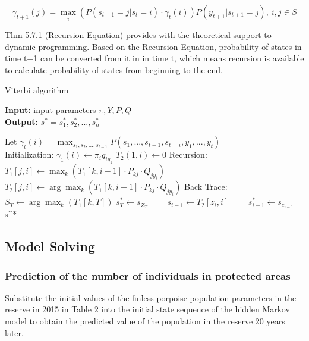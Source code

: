 \documentclass[12pt]{article}  %
\begin{document}
\begin{Theorem} 
\begin{equation}
\gamma_{t+1}(j) = \max_i ( P(s_{t+1}=j|s_t=i) \cdot \gamma_t(i) )P(y_{t+1}|s_{t+1}=j) , \ i,j \in S   
\end{equation}

\end{Theorem}

Thm 5.7.1 (Recursion Equation) provides with the theoretical support to dynamic programming. Based on the Recursion Equation, probability of states in time t+1 can be converted from it in in time t, which means recursion is available to calculate probability of states from beginning to the end.


\begin{algorithm}[]
\caption{Viterbi algorithm}
\hspace*{0.02in} {\bf Input:}
input parameters $\pi ,Y , P, Q$\\
\hspace*{0.02in} {\bf Output:} 
$s^*={s^*_1,s^*_2,...,s^*_n}$
\begin{algorithmic}[1]
\State
Let $\gamma_t(i)=\max_{s_1,s_2,...,s_{t-1}}P(s_1,...,s_{t-1},s_{t=i},y_1,...,y_t)$ \\
Initialization:
    \State $\gamma_1(i) \xleftarrow{} \pi_i q_{i y_1}$
    \State $T_2(1,i) \xleftarrow{} 0$
\EndFor
\State Recursion:
        \State $T_1[j,i] \xleftarrow{} \max_k(T_1[k,i-1] \cdot P_{k j} \cdot Q_{j y_i})$
        \State $T_2[j,i] \xleftarrow{} \arg \max_k (T_1[k,i-1] \cdot P_{k j} \cdot Q_{j y_i})$
    \EndFor
\EndFor
\State Back Trace: 
\State $S_T \xleftarrow{} \arg \max_k(T_1[k,T])$ 
\State $s^*_T \xleftarrow{} s_{Z_T}$
　　\State $s_{i-1} \xleftarrow{} T_2[z_i,i]$
　　\State $s^*_{i-1} \xleftarrow{} s_{z_{i-1}}$ 
\EndFor
\Return s^*
\end{algorithmic}
\end{algorithm}

\subsection{Model Solving}

\subsubsection{Prediction of the number of individuals in protected areas}
Substitute the initial values of the finless porpoise population parameters in the reserve in 2015 in Table 2 into the initial state sequence of the hidden Markov model to obtain the predicted value of the population in the reserve 20 years later.
\end{document}
